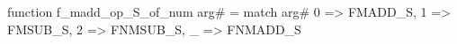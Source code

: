 function f_madd_op_S_of_num arg# = match arg# {
  0 => FMADD_S,
  1 => FMSUB_S,
  2 => FNMSUB_S,
  _ => FNMADD_S
}
